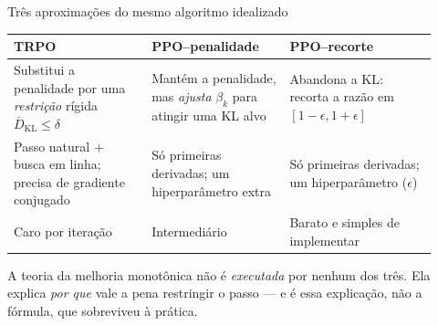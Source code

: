 \documentclass[aspectratio=169, 10pt]{beamer}
\begin{document}
\begin{frame}{Três aproximações do mesmo algoritmo idealizado}

  \begin{center}\small
  \begin{tabular}{@{}p{0.30\linewidth}p{0.30\linewidth}p{0.32\linewidth}@{}}
    \toprule
    \textbf{TRPO} & \textbf{PPO--penalidade} & \textbf{PPO--recorte}\\
    \midrule
    Substitui a penalidade por uma \emph{restrição} rígida
      $\bar{D}_{\mathrm{KL}} \le \delta$ &
    Mantém a penalidade, mas \emph{ajusta} $\beta_k$ para atingir uma KL alvo &
    Abandona a KL: recorta a razão em $[1-\epsilon, 1+\epsilon]$\\[0.4em]
    Passo natural + busca em linha; precisa de gradiente conjugado &
    Só primeiras derivadas; um hiperparâmetro extra &
    Só primeiras derivadas; um hiperparâmetro ($\epsilon$)\\[0.4em]
    Caro por iteração &
    Intermediário &
    Barato e simples de implementar\\
    \bottomrule
  \end{tabular}
  \end{center}

  \begin{ideiabox}
    A teoria da melhoria monotônica não é \emph{executada} por nenhum dos três. Ela
    explica \emph{por que} vale a pena restringir o passo --- e é essa explicação, não
    a fórmula, que sobreviveu à prática.
  \end{ideiabox}
\end{frame}
\end{document}

